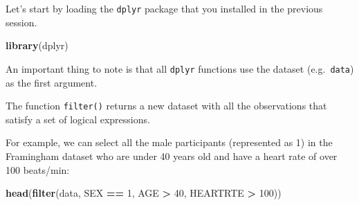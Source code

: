 \documentclass[
]{article}
\newenvironment{Shaded}{\begin{snugshade}}{\end{snugshade}}
\newcommand{\DecValTok}[1]{\textcolor[rgb]{0.00,0.00,0.81}{#1}}
\newcommand{\KeywordTok}[1]{\textcolor[rgb]{0.13,0.29,0.53}{\textbf{#1}}}
\newcommand{\NormalTok}[1]{#1}
\newcommand{\OperatorTok}[1]{\textcolor[rgb]{0.81,0.36,0.00}{\textbf{#1}}}
\newcommand{\StringTok}[1]{\textcolor[rgb]{0.31,0.60,0.02}{#1}}
\begin{document}
Let's start by loading the \texttt{dplyr} package that you installed in
the previous session.

\begin{Shaded}
\begin{Highlighting}[]
\KeywordTok{library}\NormalTok{(dplyr)}
\end{Highlighting}
\end{Shaded}

An important thing to note is that all \texttt{dplyr} functions use the
dataset (e.g.~\texttt{data}) as the first argument.

The function \texttt{filter()} returns a new dataset with all the
observations that satisfy a set of logical expressions.

For example, we can select all the male participants (represented as 1)
in the Framingham dataset who are under 40 years old and have a heart
rate of over 100 beats/min:

\begin{Shaded}
\begin{Highlighting}[]
\KeywordTok{head}\NormalTok{(}\KeywordTok{filter}\NormalTok{(data, SEX }\OperatorTok{==}\StringTok{ }\DecValTok{1}\NormalTok{, AGE }\OperatorTok{>}\StringTok{ }\DecValTok{40}\NormalTok{, HEARTRTE }\OperatorTok{>}\StringTok{ }\DecValTok{100}\NormalTok{))}
\end{Highlighting}
\end{Shaded}
\end{document}
